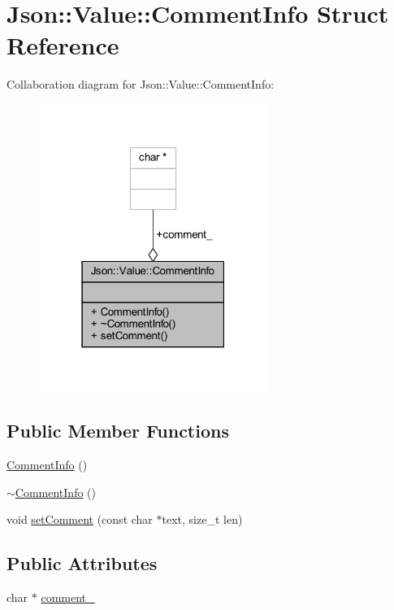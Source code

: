 \hypertarget{struct_json_1_1_value_1_1_comment_info}{}\section{Json\+:\+:Value\+:\+:Comment\+Info Struct Reference}
\label{struct_json_1_1_value_1_1_comment_info}


Collaboration diagram for Json\+:\+:Value\+:\+:Comment\+Info\+:\nopagebreak
\begin{figure}[H]
\begin{center}
\leavevmode
\includegraphics[width=211pt]{struct_json_1_1_value_1_1_comment_info__coll__graph}
\end{center}
\end{figure}
\subsection*{Public Member Functions}
\begin{DoxyCompactItemize}
\item 
\hyperlink{struct_json_1_1_value_1_1_comment_info_ab23b0c125695d284bded2fb106a49043}{Comment\+Info} ()
\item 
\hyperlink{struct_json_1_1_value_1_1_comment_info_ab4d0877190bdbf484e4e2a3bade42ac8}{$\sim$\+Comment\+Info} ()
\item 
void \hyperlink{struct_json_1_1_value_1_1_comment_info_a4d01c2cd8c07995969c5d636dfd4fa8c}{set\+Comment} (const char $\ast$text, size\+\_\+t len)
\end{DoxyCompactItemize}
\subsection*{Public Attributes}
\begin{DoxyCompactItemize}
\item 
char $\ast$ \hyperlink{struct_json_1_1_value_1_1_comment_info_a020f19c7098bab8ec8fec14cd1a5afb9}{comment\+\_\+}
\end{DoxyCompactItemize}


